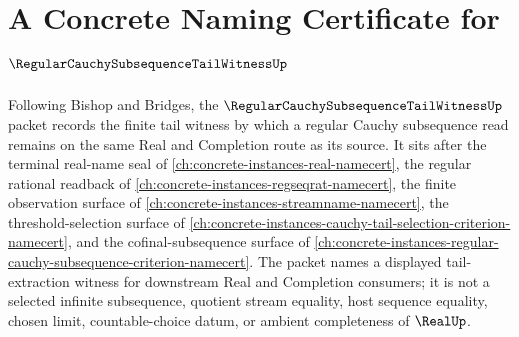 \chapter{A Concrete Naming Certificate for $\RegularCauchySubsequenceTailWitnessUp$}
\label{ch:concrete-instances-regular-cauchy-subsequence-tail-witness-namecert}

Following Bishop and Bridges, the $\RegularCauchySubsequenceTailWitnessUp$ packet records the finite tail witness by which a regular Cauchy subsequence read remains on the same Real and Completion route as its source. It sits after the terminal real-name seal of \autoref{ch:concrete-instances-real-namecert}, the regular rational readback of \autoref{ch:concrete-instances-regseqrat-namecert}, the finite observation surface of \autoref{ch:concrete-instances-streamname-namecert}, the threshold-selection surface of \autoref{ch:concrete-instances-cauchy-tail-selection-criterion-namecert}, and the cofinal-subsequence surface of \autoref{ch:concrete-instances-regular-cauchy-subsequence-criterion-namecert}. The packet names a displayed tail-extraction witness for downstream Real and Completion consumers; it is not a selected infinite subsequence, quotient stream equality, host sequence equality, chosen limit, countable-choice datum, or ambient completeness of $\RealUp$.

